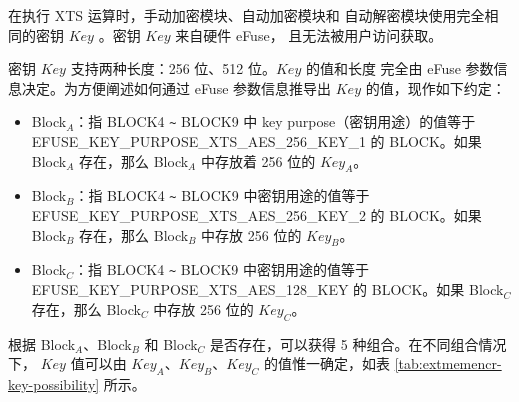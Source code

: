 \documentclass[main\_\_CN.tex]{subfiles}
\begin{document}
在执行 XTS 运算时，手动加密模块、自动加密模块和 自动解密模块使用完全相同的密钥 \begin{math}Key\end{math} 。密钥 \begin{math}Key\end{math}  来自硬件 eFuse， 且无法被用户访问获取。

密钥 \begin{math}Key\end{math} 支持两种长度：256 位、512 位。\begin{math}Key\end{math} 的值和长度 完全由 eFuse 参数信息决定。为方便阐述如何通过 eFuse 参数信息推导出  \begin{math}Key\end{math} 的值，现作如下约定：
\begin{itemize}
    \item Block$_A$：指 BLOCK4 \verb+~+ BLOCK9 中 key purpose（密钥用途）的值等于 EFUSE\_KEY\_PURPOSE\_XTS\_AES\_256\_KEY\_1 的 BLOCK。如果 Block$_A$ 存在，那么 Block$_A$ 中存放着 256 位的 \begin{math}Key_{A}\end{math}。

    \item Block$_B$：指 BLOCK4 \verb+~+ BLOCK9 中密钥用途的值等于 EFUSE\_KEY\_PURPOSE\_XTS\_AES\_256\_KEY\_2 的 BLOCK。如果 Block$_B$ 存在，那么 Block$_B$ 中存放 256 位的 \begin{math}Key_{B}\end{math}。

    \item Block$_C$：指 BLOCK4 \verb+~+ BLOCK9 中密钥用途的值等于 EFUSE\_KEY\_PURPOSE\_XTS\_AES\_128\_KEY 的 BLOCK。如果 Block$_C$ 存在，那么 Block$_C$ 中存放 256 位的 \begin{math}Key_{C}\end{math}。
\end{itemize}

根据 Block$_A$、Block$_B$ 和 Block$_C$ 是否存在，可以获得 5 种组合。在不同组合情况下， \begin{math}Key\end{math} 值可以由 \begin{math}Key_{A}\end{math}、\begin{math}Key_{B}\end{math}、\begin{math}Key_{C}\end{math} 的值惟一确定，如表 \ref{tab:extmemencr-key-possibility} 所示。
\end{document}
